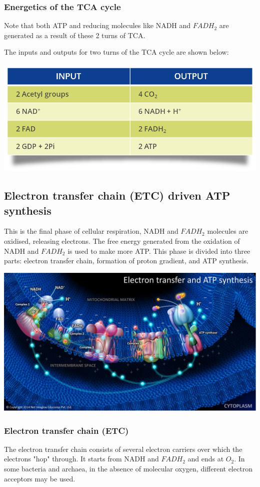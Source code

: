 \documentclass[11pt]{article}
\begin{document}
\subsubsection{Energetics of the TCA cycle}
\label{sec:org5047afb}
Note that both ATP and reducing molecules like NADH and \(FADH_2\) are generated as a result of these 2 turns of TCA.


The inputs and outputs for two turns of the TCA cycle are shown below:
\begin{center}
\includegraphics[scale=0.3]{./images/tca-inputs-and-outputs.png}
\end{center}
\subsection{Electron transfer chain (ETC) driven ATP synthesis}
\label{sec:org680c32c}
This is the final phase of cellular respiration, NADH and \(FADH_2\) molecules are oxidised, releasing electrons. The free energy generated from the oxidation of NADH and \(FADH_2\) is used to make more ATP. This phase is divided into three parts: electron transfer chain, formation of proton gradient, and ATP synthesis.
\begin{center}
\includegraphics[width=.9\linewidth]{./images/electron-transfer-and-atp-synthesis.png}
\end{center}
\subsubsection{Electron transfer chain (ETC)}
\label{sec:org9f008ae}
The electron transfer chain consists of several electron carriers over which the electrons "hop" through. It starts from NADH and \(FADH_2\) and ends at \(O_2\). In some bacteria and archaea, in the absence of molecular oxygen, different electron acceptors may be used.
\end{document}
